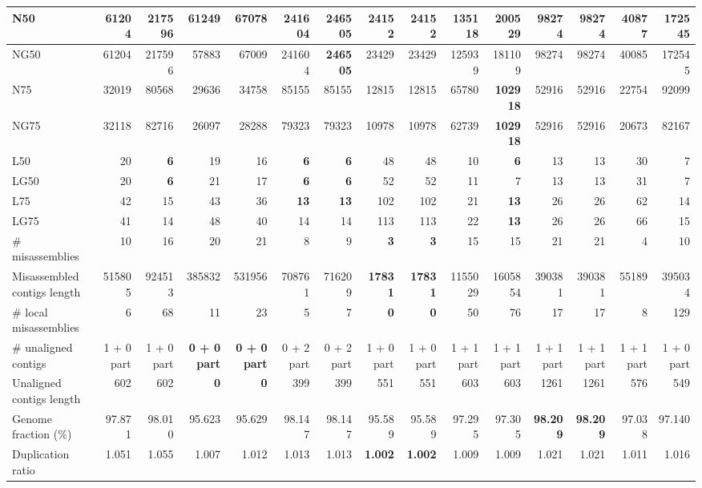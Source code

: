 \documentclass[12pt,a4paper]{article}
\begin{document}
\begin{table}[ht]
\begin{center}
\begin{tabular}{|l*{14}{|r}|}
N50 & 61204 & 217596 & 61249 & 67078 & 241604 & {\bf 246505} & 24152 & 24152 & 135118 & 200529 & 98274 & 98274 & 40877 & 172545 \\ \hline
NG50 & 61204 & 217596 & 57883 & 67009 & 241604 & {\bf 246505} & 23429 & 23429 & 125939 & 181109 & 98274 & 98274 & 40085 & 172545 \\ \hline
N75 & 32019 & 80568 & 29636 & 34758 & 85155 & 85155 & 12815 & 12815 & 65780 & {\bf 102918} & 52916 & 52916 & 22754 & 92099 \\ \hline
NG75 & 32118 & 82716 & 26097 & 28288 & 79323 & 79323 & 10978 & 10978 & 62739 & {\bf 102918} & 52916 & 52916 & 20673 & 82167 \\ \hline
L50 & 20 & {\bf 6} & 19 & 16 & {\bf 6} & {\bf 6} & 48 & 48 & 10 & {\bf 6} & 13 & 13 & 30 & 7 \\ \hline
LG50 & 20 & {\bf 6} & 21 & 17 & {\bf 6} & {\bf 6} & 52 & 52 & 11 & 7 & 13 & 13 & 31 & 7 \\ \hline
L75 & 42 & 15 & 43 & 36 & {\bf 13} & {\bf 13} & 102 & 102 & 21 & {\bf 13} & 26 & 26 & 62 & 14 \\ \hline
LG75 & 41 & 14 & 48 & 40 & 14 & 14 & 113 & 113 & 22 & {\bf 13} & 26 & 26 & 66 & 15 \\ \hline
\# misassemblies & 10 & 16 & 20 & 21 & 8 & 9 & {\bf 3} & {\bf 3} & 15 & 15 & 21 & 21 & 4 & 10 \\ \hline
Misassembled contigs length & 515805 & 924513 & 385832 & 531956 & 708761 & 716209 & {\bf 17831} & {\bf 17831} & 1155029 & 1605854 & 390381 & 390381 & 55189 & 395034 \\ \hline
\# local misassemblies & 6 & 68 & 11 & 23 & 5 & 7 & {\bf 0} & {\bf 0} & 50 & 76 & 17 & 17 & 8 & 129 \\ \hline
\# unaligned contigs & 1 + 0 part & 1 + 0 part & {\bf 0 + 0 part} & {\bf 0 + 0 part} & 0 + 2 part & 0 + 2 part & 1 + 0 part & 1 + 0 part & 1 + 1 part & 1 + 1 part & 1 + 1 part & 1 + 1 part & 1 + 1 part & 1 + 0 part \\ \hline
Unaligned contigs length & 602 & 602 & {\bf 0} & {\bf 0} & 399 & 399 & 551 & 551 & 603 & 603 & 1261 & 1261 & 576 & 549 \\ \hline
Genome fraction (\%) & 97.871 & 98.010 & 95.623 & 95.629 & 98.147 & 98.147 & 95.589 & 95.589 & 97.295 & 97.305 & {\bf 98.209} & {\bf 98.209} & 97.038 & 97.140 \\ \hline
Duplication ratio & 1.051 & 1.055 & 1.007 & 1.012 & 1.013 & 1.013 & {\bf 1.002} & {\bf 1.002} & 1.009 & 1.009 & 1.021 & 1.021 & 1.011 & 1.016 \\ \hline

\end{tabular}
\end{center}
\end{table}
\end{document}
